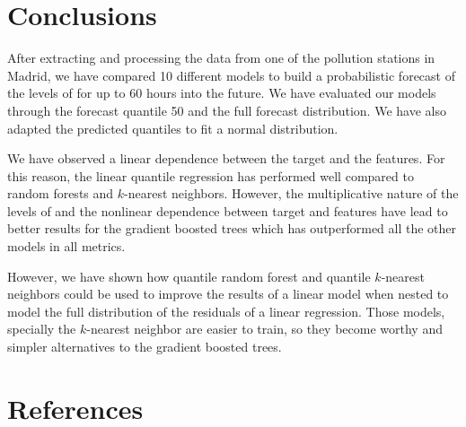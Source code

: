 \documentclass[a4paper,3p,sort&compress]{elsarticle}
\begin{document}


\section{Conclusions}
\label{sec:concl}

After extracting and processing the data from one of the pollution stations in
Madrid, we have compared 10 different models to build a probabilistic forecast
of the levels of \no for up to 60 hours into the future. We have evaluated our
models through the forecast quantile 50 and the full forecast distribution. We 
have also adapted the predicted quantiles to fit a normal distribution. 

We have observed a linear dependence between the target and the features. For
this reason, the linear quantile regression has performed well compared to
random forests and $k$-nearest neighbors. However, the multiplicative nature of
the levels of \no and the nonlinear dependence between target and features have
lead to better results for the gradient boosted trees which has outperformed all
the other models in all metrics.

However, we have shown how quantile random forest and quantile $k$-nearest
neighbors could be used to improve the results of a linear model when nested to
model the full distribution of the residuals of a linear regression. Those
models, specially the $k$-nearest neighbor are easier to train, so they become
worthy and simpler alternatives to the gradient boosted trees.



\section*{References}


\end{document}

